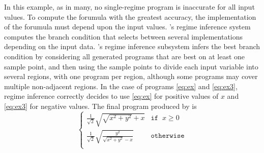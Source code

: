 \documentclass[paper.tex]{subfiles}
\begin{document}
In this example, as in many,
  no single-regime program is inaccurate for all input values.
To compute the forumula with the greatest accuracy,
  the implementation of the forumula must depend upon the input values.
\casio's regime inference system
  computes the branch condition
  that selects between several implementations depending on the input data.
\casio's regime inference subsystem
  infers the best branch condition
  by considering all generated programs
  that are best on at least one sample point,
  and then using the sample points to divide each input variable
  into several regions, with one program per region,
  although some programs may cover multiple non-adjacent regions.
In the case of programs \eqref{eq:ex} and \eqref{eq:ex3},
  regime inference correctly decides
  to use \eqref{eq:ex} for positive values of $x$
  and \eqref{eq:ex3} for negative values.
The final program produced by \casio is
\[
\begin{cases}
  \frac1{\sqrt2} \sqrt{\sqrt{x^2 + y^2} + x} & \mathtt{if} \;\; x \ge 0 \\[8pt]
  \frac1{\sqrt2} \sqrt{\frac{y^2}{\sqrt{x^2 + y^2} - x}} & \mathtt{otherwise} \\
\end{cases}
\]
\end{document}
